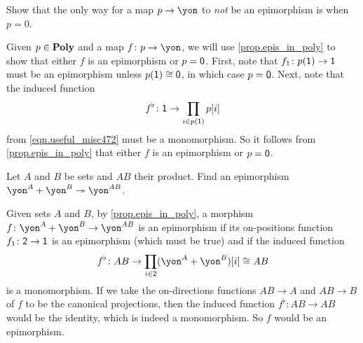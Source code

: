 \documentclass[Book-Poly]{subfiles}
\begin{document}

\begin{exercise}
Show that the only way for a map $p\to\yon$ to \emph{not} be an epimorphism is when $p=0$.
\begin{solution}
Given $p \in \mathbf{Poly}$ and a map $f \colon p \to \yon$, we will use \cref{prop.epis_in_poly} to show that either $f$ is an epimorphism or $p = \textsf{0}$.
First, note that $f_1 \colon p(\textsf{1}) \to \textsf{1}$ must be an epimorphism unless $p(\textsf{1}) \cong \textsf{0}$, in which case $p = \textsf{0}$.
Next, note that the induced function
\[
    f^\flat \colon \textsf{1} \to \prod_{i\in p(\textsf{1})} p[i]
\]
from \eqref{eqn.useful_misc472} must be a monomorphism.
So it follows from \cref{prop.epis_in_poly} that either $f$ is an epimorphism or $p = \textsf{0}$.
\end{solution}
\end{exercise}

\begin{exercise}
Let $A$ and $B$ be sets and $AB$ their product. Find an epimorphism $\yon^A+\yon^B\surj\yon^{AB}$.
\begin{solution}
Given sets $A$ and $B$, by \cref{prop.epis_in_poly}, a morphism $f \colon \yon^A + \yon^B \to \yon^{AB}$ is an epimorphism if its on-positions function $f_1 \colon \textsf{2} \to \textsf{1}$ is an epimorphism (which must be true) and if the induced function
\[
    f^\flat \colon AB \to \prod_{i \in \2} (\yon^A + \yon^B)[i] \iso AB
\]
is a monomorphism.
If we take the on-directions functions $AB \to A$ and $AB \to B$ of $f$ to be the canonical projections, then the induced function $f^\flat \colon AB \to AB$ would be the identity, which is indeed a monomorphism.
So $f$ would be an epimorphism.
\end{solution}
\end{exercise}
\end{document}

